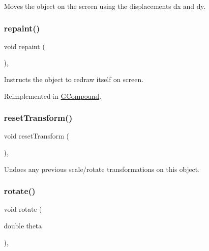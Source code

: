 Moves the object on the screen using the displacements {\ttfamily dx} and {\ttfamily dy}. 

\mbox{\label{classGObject_ac827b978aa122f136a14c198687ad80f}} 
\subsubsection{\texorpdfstring{repaint()}{repaint()}}
{\footnotesize\ttfamily void repaint (\begin{DoxyParamCaption}{ }\end{DoxyParamCaption})\hspace{0.3cm}{\ttfamily [virtual]}, {\ttfamily [inherited]}}



Instructs the object to redraw itself on screen. 



Reimplemented in \mbox{\hyperlink{classGCompound_ac827b978aa122f136a14c198687ad80f}{G\+Compound}}.

\mbox{\label{classGObject_a6022a1fd1e5dcd2fd5585e5a36aa3f37}} 
\subsubsection{\texorpdfstring{reset\+Transform()}{resetTransform()}}
{\footnotesize\ttfamily void reset\+Transform (\begin{DoxyParamCaption}{ }\end{DoxyParamCaption})\hspace{0.3cm}{\ttfamily [virtual]}, {\ttfamily [inherited]}}



Undoes any previous scale/rotate transformations on this object. 

\mbox{\label{classGObject_ae1ffaa12185dfd5ba464f7d87c329e26}} 
\subsubsection{\texorpdfstring{rotate()}{rotate()}}
{\footnotesize\ttfamily void rotate (\begin{DoxyParamCaption}\item[{double}]{theta }\end{DoxyParamCaption})\hspace{0.3cm}{\ttfamily [virtual]}, {\ttfamily [inherited]}}



